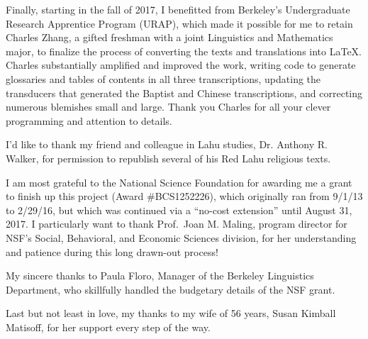 Finally, starting in the fall of 2017, I benefitted from Berkeley's
Undergraduate Research Apprentice Program (URAP), which made it possible
for me to retain Charles Zhang, a gifted freshman with a joint Linguistics
and Mathematics major, to finalize the process of converting the
texts and translations into LaTeX. Charles substantially amplified and improved the work,
writing code to generate glossaries and tables of contents in all three transcriptions,
updating the transducers that generated the Baptist and Chinese transcriptions, and correcting
numerous blemishes small and large. Thank you Charles for all your clever programming
and attention to details.

I'd like to thank my friend and colleague in Lahu studies, Dr. Anthony
R. Walker, for permission to republish several of his Red Lahu religious
texts.

I am most grateful to the National Science Foundation for awarding me
a grant to finish up this project (Award \#BCS1252226), which
originally ran from 9/1/13 to 2/29/16, but which was continued via a
``no-cost extension'' until August 31, 2017. I particularly want to
thank Prof.\ Joan M. Maling, program director for NSF's Social,
Behavioral, and Economic Sciences division, for her understanding and
patience during this long drawn-out process!

My sincere thanks to Paula Floro, Manager of the Berkeley Linguistics
Department, who skillfully handled the budgetary details of the NSF
grant.

Last but not least in love, my thanks to my wife of 56 years, Susan
Kimball Matisoff, for her support every step of the way.